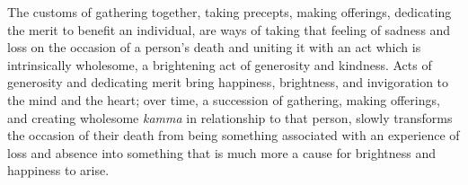 The customs of gathering together, taking precepts, making offerings, 
dedicating the merit to benefit an individual, are ways of taking that 
feeling of sadness and loss on the occasion of a person's death and 
uniting it with an act which is intrinsically wholesome, a brightening 
act of generosity and kindness. Acts of generosity and dedicating merit 
bring happiness, brightness, and invigoration to the mind and the 
heart; over time, a succession of gathering, making offerings, and 
creating wholesome \emph{kamma} in relationship to that person, slowly 
transforms the occasion of their death from being something associated 
with an experience of loss and absence into something that is much more 
a cause for brightness and happiness to arise.


